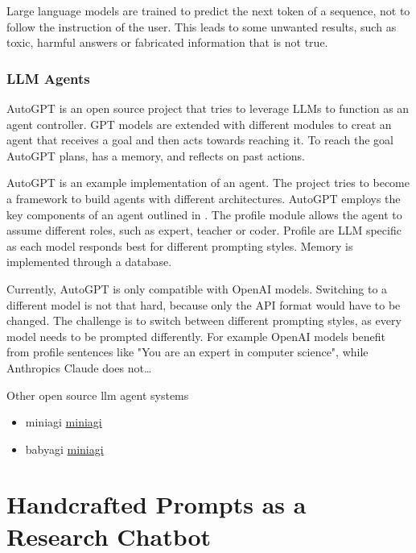 \documentclass[english, version-2022-01]{uzl-thesis}
\begin{document}
Large language models are trained to predict the next token of a sequence, not to follow the instruction of the user. This leads to some unwanted results, such as toxic, harmful answers or fabricated information that is not true.

\subsection{LLM Agents}

AutoGPT is an open source project that tries to leverage LLMs to function as an agent controller. GPT models are extended with different modules to creat an agent that receives a goal and then acts towards reaching it. To reach the goal AutoGPT plans, has a memory, and reflects on past actions.

AutoGPT is an example implementation of an agent. The project tries to become a framework to build agents with different architectures.
AutoGPT employs the key components of an agent outlined in \cite{Wang2023}. The profile module allows the agent to assume different roles, such as expert, teacher or coder. Profile are LLM specific as each model responds best for different prompting styles. Memory is implemented through a database.

Currently, AutoGPT is only compatible with OpenAI models. Switching to a different model is not that hard, because only the API format would have to be changed. The challenge is to switch between different prompting styles, as every model needs to be prompted differently. For example OpenAI models benefit from profile sentences like "You are an expert in computer science", while Anthropics Claude does not\dots

Other open source llm agent systems
\begin{itemize}
	\item miniagi \href{}{miniagi}
	\item babyagi \href{https://github.com/yoheinakajima/babyagi}{miniagi}
\end{itemize}

\chapter{Handcrafted Prompts as a Research Chatbot}
\end{document}
